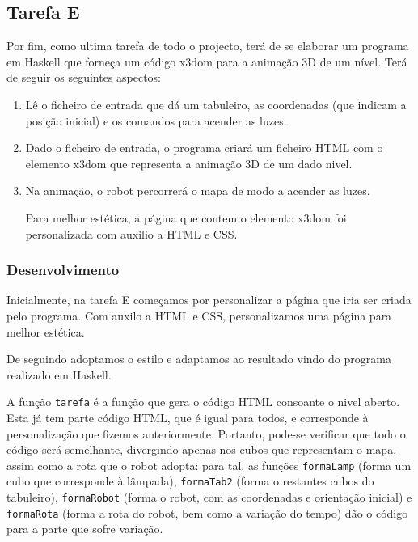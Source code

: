 \documentclass[a4paper]{article}
\begin{document}
\subsection{Tarefa E}
Por fim, como ultima tarefa de todo o projecto, terá de se elaborar um programa em Haskell que forneça um código x3dom para a animação 3D de um nível.
Terá de seguir os seguintes aspectos:

\begin{enumerate}
\item Lê o ficheiro de entrada que dá um tabuleiro, as coordenadas (que indicam a posição inicial) e os comandos para acender as luzes.

\item Dado o ficheiro de entrada, o programa criará um ficheiro HTML com o elemento x3dom que representa a animação 3D de um dado nivel.

\item Na animação, o robot percorrerá o mapa de modo a acender as luzes.

Para melhor estética, a página que contem o elemento x3dom foi personalizada com auxilio a HTML e CSS.
\end{enumerate}

\subsubsection{Desenvolvimento}

Inicialmente, na tarefa E começamos por personalizar a página que iria ser criada pelo programa. Com auxilo a HTML e CSS, personalizamos uma página para melhor estética.

De seguindo adoptamos o estilo e adaptamos ao resultado vindo do programa realizado em Haskell.

A função \verb|tarefa| é a função que gera o código HTML consoante o nivel aberto. Esta já tem parte código HTML, que é igual para todos, e corresponde à personalização que fizemos anteriormente. Portanto, pode-se verificar que todo o código será semelhante, divergindo apenas nos cubos que representam o mapa, assim como a rota que o robot adopta: para tal, as funções \verb|formaLamp| (forma um cubo que corresponde à lâmpada), \verb|formaTab2| (forma o restantes cubos do tabuleiro), \verb|formaRobot| (forma o robot, com as coordenadas e orientação inicial) e \verb|formaRota| (forma a rota do robot, bem como a variação do tempo) dão o código para a parte que sofre variação.

\break
\end{document}
